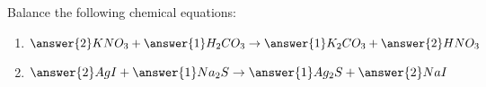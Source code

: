 \documentclass{ximera}
\author{Zack Reed}
\begin{document}
\begin{problem}

Balance the following chemical equations:

\begin{enumerate}

    \item $\answer{2}KNO_3+\answer{1}H_2CO_3\rightarrow \answer{1}K_2CO_3+\answer{2}HNO_3$
    \item $\answer{2}AgI+\answer{1}Na_2S\rightarrow \answer{1}Ag_2S+\answer{2}NaI$
    
\end{enumerate}

\end{problem}
\end{document}

